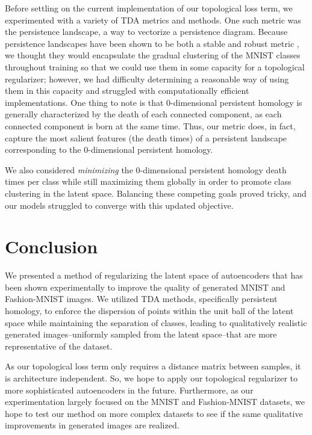 \documentclass[conference]{IEEEtran}
\begin{document}
Before settling on the current implementation of our topological loss term, we experimented with a variety of TDA metrics and methods. One such metric was the persistence landscape, a way to vectorize a persistence diagram. Because persistence landscapes have been shown to be both a stable and robust metric \cite{persistence-landscapes}, we thought they would encapsulate the gradual clustering of the MNIST classes throughout training so that we could use them in some capacity for a topological regularizer; however, we had difficulty determining a reasonable way of using them in this capacity and struggled with computationally efficient implementations. One thing to note is that 0-dimensional persistent homology is generally characterized by the death of each connected component, as each connected component is born at the same time. Thus, our metric does, in fact, capture the most salient features (the death times) of a persistent landscape corresponding to the 0-dimensional persistent homology.

We also considered \emph{minimizing} the 0-dimensional persistent homology death times per class while still maximizing them globally in order to promote class clustering in the latent space. Balancing these competing goals proved tricky, and our models struggled to converge with this updated objective.

\section{Conclusion}
We presented a method of regularizing the latent space of autoencoders that has been shown experimentally to improve the quality of generated MNIST and Fashion-MNIST images. We utilized TDA methods, specifically persistent homology, to enforce the dispersion of points within the unit ball of the latent space while maintaining the separation of classes, leading to qualitatively realistic generated images--uniformly sampled from the latent space--that are more representative of the dataset.

As our topological loss term only requires a distance matrix between samples, it is architecture independent. So, we hope to apply our topological regularizer to more sophisticated autoencoders in the future. Furthermore, as our experimentation largely focused on the MNIST and Fashion-MNIST datasets, we hope to test our method on more complex datasets to see if the same qualitative improvements in generated images are realized. 
\end{document}
